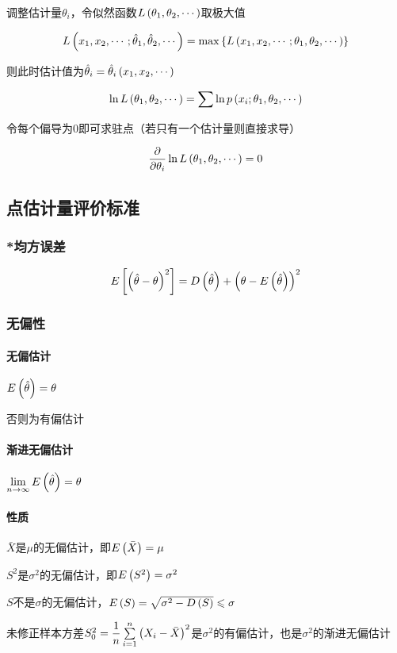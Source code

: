 \documentclass{article}
\begin{document}
调整估计量$\theta_i$，令似然函数$L\left(\theta_1,\theta_2,\cdots\right)$取极大值

\[L\left(x_1,x_2,\cdots;\hat\theta_1,\hat\theta_2,\cdots\right)=\max\left\{L\left(x_1,x_2,\cdots;\theta_1,\theta_2,\cdots\right)\right\}\]

则此时估计值为$\hat\theta_i=\hat\theta_i\left(x_1,x_2,\cdots\right)$

\[\ln L\left(\theta_1,\theta_2,\cdots\right)=\sum\ln p\left(x_i;\theta_1,\theta_2,\cdots\right)\]

令每个偏导为$0$即可求驻点（若只有一个估计量则直接求导）

\[\frac\partial{\partial\theta_i}\ln L\left(\theta_1,\theta_2,\cdots\right)=0\]

\subsection{点估计量评价标准}

\subsubsection{*均方误差}

\[E\left[\left(\hat\theta-\theta\right)^2\right]=D\left(\hat\theta\right)+{\left(\theta-E\left(\hat\theta\right)\right)}^2\]

\subsubsection{无偏性}

\paragraph{无偏估计}$E\left(\hat\theta\right)=\theta$

否则为有偏估计

\paragraph{渐进无偏估计}$\lim\limits_{n\to\infty}E\left(\hat\theta\right)=\theta$

\paragraph{性质}

$\bar X$是$\mu$的无偏估计，即$E\left(\bar X\right)=\mu$

$S^2$是$\sigma^2$的无偏估计，即$E\left(S^2\right)=\sigma^2$

$S$不是$\sigma$的无偏估计，$E\left(S\right)=\sqrt{\sigma^2-D\left(S\right)}\leqslant\sigma$

未修正样本方差$S_0^2=\dfrac1n\sum\limits_{i=1}^n{\left(X_i-\bar X\right)}^2$是$\sigma^2$的有偏估计，也是$\sigma^2$的渐进无偏估计
\end{document}
